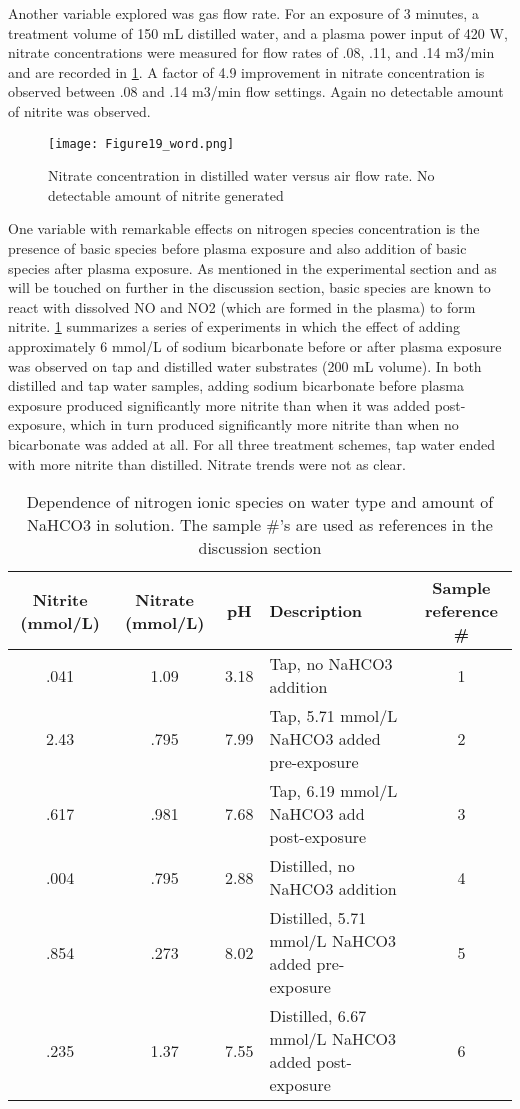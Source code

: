 Another variable explored was gas flow rate.  For an exposure of 3 minutes, a treatment volume of 150 mL distilled water, and a plasma power input of 420 W, nitrate concentrations were measured for flow rates of .08, .11, and .14 m3/min and are recorded in \cref{fig:nitrogen_vs_flow}.  A factor of 4.9 improvement in nitrate concentration is observed between .08 and .14 m3/min flow settings.  Again no detectable amount of nitrite was observed.

\begin{figure}[htbp]
  \centering
  \texttt{[image: Figure19\_word.png]}
  \caption{Nitrate concentration in distilled water versus air flow rate. No detectable amount of nitrite generated}
  \label{fig:nitrogen_vs_flow}
\end{figure}

One variable with remarkable effects on nitrogen species concentration is the presence of basic species before plasma exposure and also addition of basic species after plasma exposure.  As mentioned in the experimental section and as will be touched on further in the discussion section, basic species are known to react with dissolved NO and NO2 (which are formed in the plasma) to form nitrite. \cref{tab:bicarb} summarizes a series of experiments in which the effect of adding approximately 6 mmol/L of sodium bicarbonate before or after plasma exposure was observed on tap and distilled water substrates (200 mL volume).  In both distilled and tap water samples, adding sodium bicarbonate before plasma exposure produced significantly more nitrite than when it was added post-exposure, which in turn produced significantly more nitrite than when no bicarbonate was added at all.  For all three treatment schemes, tap water ended with more nitrite than distilled.  Nitrate trends were not as clear.

\begin{table}[htpb]
  \begin{center}
    \begin{tabularx}{\textwidth}{|c |c |c |X |c |}
      \hline
      \textbf{Nitrite (mmol/L)} & \textbf{Nitrate (mmol/L)} & \textbf{pH} & \textbf{Description} & \textbf{Sample reference \#} \\\hline
      .041 & 1.09 & 3.18 & Tap, no NaHCO3 addition & 1 \\\hline
      2.43 & .795 & 7.99 & Tap, 5.71 mmol/L NaHCO3 added pre-exposure & 2 \\\hline
      .617 & .981 & 7.68 & Tap, 6.19 mmol/L NaHCO3 add post-exposure & 3 \\\hline
      .004 & .795 & 2.88 & Distilled, no NaHCO3 addition & 4 \\\hline
      .854 & .273 & 8.02 & Distilled, 5.71 mmol/L NaHCO3 added pre-exposure & 5 \\\hline
      .235 & 1.37 & 7.55 & Distilled, 6.67 mmol/L NaHCO3 added post-exposure & 6 \\\hline
    \end{tabularx}
  \end{center}
  \caption{Dependence of nitrogen ionic species on water type and amount of NaHCO3 in solution.  The sample \#'s are used as references in the discussion section}
  \label{tab:bicarb}
\end{table}

